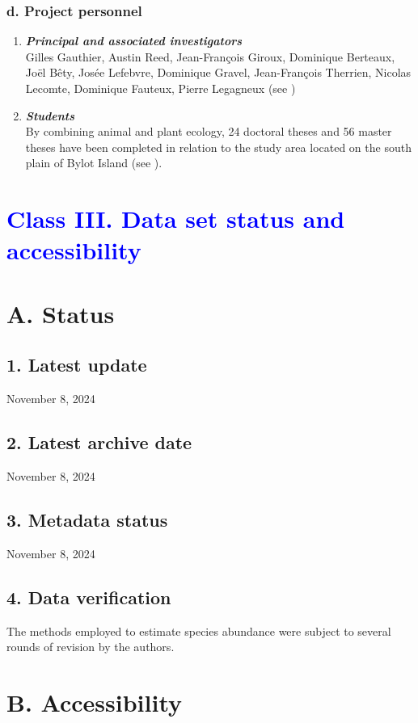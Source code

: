 \documentclass[a4paper,twoside,12pt]{article}
\begin{document}
                \subsubsection*{d. Project personnel}
                \begin{enumerate}[label=\alph*.]
                        \item[] \textit{\textbf{Principal and associated investigators}}\\
                        Gilles Gauthier, Austin Reed, Jean-François Giroux, Dominique Berteaux, Joël Bêty, Josée Lefebvre, Dominique Gravel, Jean-François Therrien, Nicolas Lecomte, Dominique Fauteux, Pierre Legagneux (see \citet{gauthier2024b})
                        \item[] \textit{\textbf{Students}}\\
                        By combining animal and plant ecology, 24 doctoral theses and 56 master theses have been completed in relation to the study area located on the south plain of Bylot Island (see \citet{gauthier2024b}).
                \end{enumerate}
\newpage 
 \section*{\textcolor{Blue}{Class III. Data set status and accessibility}}
    \section*{A. Status}
                \subsection*{1. Latest update} November 8, 2024
        \subsection*{2. Latest archive date} November 8, 2024
        \subsection*{3. Metadata status} November 8, 2024
        \subsection*{4. Data verification} The methods employed to estimate species abundance were subject to several rounds of revision by the authors.
   \section*{B. Accessibility}
\end{document}
